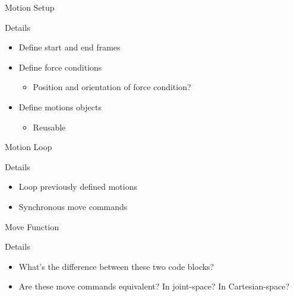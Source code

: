 \documentclass{beamer}
\begin{document}
\begin{frame}{Motion Setup}
  \begin{block}{Details}
    \begin{itemize}
      \item Define start and end frames
      \item Define force conditions
      \begin{itemize}
        \item Position and orientation of force condition?
      \end{itemize}
      \item Define motions objects
      \begin{itemize}
        \item Reusable
      \end{itemize}
    \end{itemize}
  \end{block}
\end{frame}

\begin{frame}[fragile]{Motion Loop}

  \begin{block}{Details}
    \begin{itemize}
      \item Loop previously defined motions
      \item Synchronous move commands
    \end{itemize}
  \end{block}
\end{frame}

\begin{frame}[fragile]{Move Function}


  \begin{block}{Details}
    \begin{itemize}
      \item What's the difference between these two code blocks?
      \item Are these move commands equivalent? In joint-space? In Cartesian-space?
    \end{itemize}
  \end{block}
\end{frame}
\end{document}
